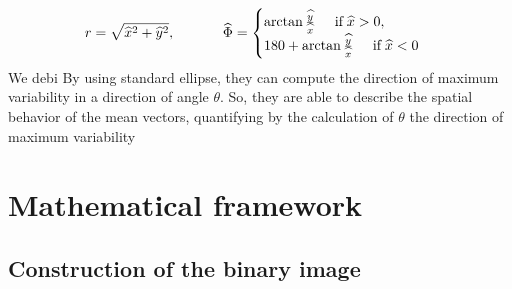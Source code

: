 \documentclass[12pt]{article}
\renewcommand{\hat}{\widehat}
\theoremstyle{Theorem}
\begin{document}
\begin{equation*}
r=\sqrt{\hat{x}^{2} + \hat{y}^{2}}, \; \hspace{1cm} \; \hat{\Phi} = \begin{cases} \arctan{\frac{\hat{y}}{\hat{x}}} \hspace{0.5cm} \text{if} \; \hat{x} > 0 , \\
180 + \arctan{\frac{\hat{y}}{\hat{x}}} \hspace{0.5cm} \text{if} \; \hat{x} < 0 
\end{cases}
\end{equation*}We debi
By using standard ellipse, they can compute the direction of maximum variability in a direction of angle $\theta$. So, they are able to describe the spatial behavior of the mean vectors, quantifying by the calculation of $\theta$ the direction of maximum variability

\section{Mathematical framework}\label{section1}
\subsection{Construction of the binary image}\label{construction}
\end{document}
